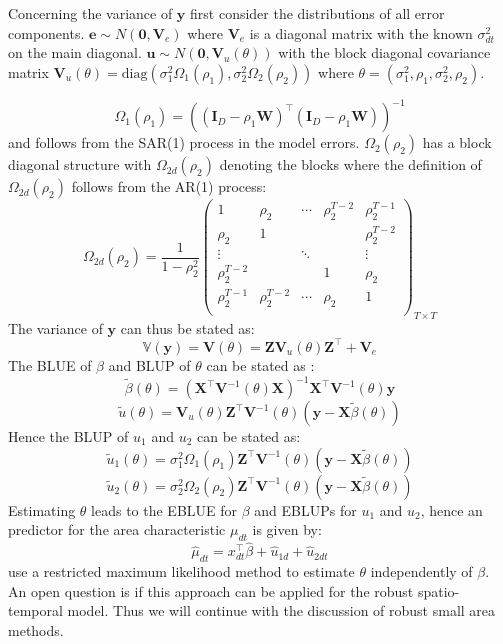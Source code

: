 Concerning the variance of $\mathbf{y}$ first consider the distributions
of all error components.
$\mathbf{e} \sim \mathit{N}(\mathbf{0}, \mathbf{V}_e)$ where
$\mathbf{V}_e$ is a diagonal matrix with the known $\sigma^2_{dt}$ on
the main diagonal.
$\mathbf{u} \sim \mathit{N}(\mathbf{0}, \mathbf{V}_u(\theta))$ with the
block diagonal covariance matrix
$\mathbf{V}_u(\theta) = \text{diag}(\sigma_1^2\Omega_1(\rho_1), \sigma_2^2\Omega_2(\rho_2))$
where $\theta = (\sigma_1^2, \rho_1, \sigma_2^2, \rho_2)$.

\[
\Omega_1(\rho_1) = \left((\mathbf{I}_D - \rho_1\mathbf{W})^\top (\mathbf{I}_D - \rho_1\mathbf{W})\right)^{-1}
\] and follows from the SAR(1) process in the model errors.
$\Omega_2(\rho_2)$ has a block diagonal structure with
$\Omega_{2d}(\rho_2)$ denoting the blocks where the definition of
$\Omega_{2d}(\rho_2)$ follows from the AR(1) process: \[
    \Omega_{2d}(\rho_2) = \frac{1}{1-\rho_2^2}
    \left(
      \begin{matrix}
      1 & \rho_2 & \cdots & \rho_2^{T-2}& \rho_2^{T-1}\\
      \rho_2 & 1 & & & \rho_2^{T-2} \\
      \vdots & & \ddots & & \vdots \\
      \rho_2^{T-2} &&& 1 & \rho_2 \\
      \rho_2^{T-1} & \rho_2^{T-2} & \cdots & \rho_2 & 1\\
      \end{matrix}
      \right)_{T\times T}
  \] The variance of $\mathbf{y}$ can thus be stated as: \[
\mathbb{V}(\mathbf{y}) = \mathbf{V}(\theta) = \mathbf{Z}\mathbf{V}_u(\theta)\mathbf{Z}^\top + \mathbf{V}_e
\] The BLUE of $\beta$ and BLUP of $\theta$ can be stated as
\citep[see][]{Hen75}: \[
\tilde{\beta}(\theta) = \left(\mathbf{X}^\top \mathbf{V}^{-1}(\theta) \mathbf{X} \right)^{-1} \mathbf{X}^\top \mathbf{V}^{-1}(\theta) \mathbf{y}
\] \[
\tilde{u}(\theta) = \mathbf{V}_u(\theta) \mathbf{Z}^\top \mathbf{V}^{-1}(\theta) \left(\mathbf{y} - \mathbf{X}\tilde{\beta}(\theta)\right)
\] Hence the BLUP of $u_1$ and $u_2$ can be stated as: \[
\tilde{u}_1(\theta) = \sigma_1^2 \Omega_1(\rho_1) \mathbf{Z}^\top \mathbf{V}^{-1}(\theta) \left(\mathbf{y} - \mathbf{X}\tilde{\beta}(\theta)\right)
\] \[
\tilde{u}_2(\theta) = \sigma_2^2 \Omega_2(\rho_2) \mathbf{Z}^\top \mathbf{V}^{-1}(\theta) \left(\mathbf{y} - \mathbf{X}\tilde{\beta}(\theta)\right)
\] Estimating $\theta$ leads to the EBLUE for $\beta$ and EBLUPs for
$u_1$ and $u_2$, hence an predictor for the area characteristic
$\mu_{dt}$ is given by: \[
\hat{\mu}_{dt} = x_{dt}^\top \hat{\beta} + \hat{u}_{1d} + \hat{u}_{2dt}
\] \textcite{Mar13} use a restricted maximum likelihood method to
estimate $\theta$ independently of $\beta$. An open question is if this
approach can be applied for the robust spatio-temporal model. Thus we
will continue with the discussion of robust small area methods.

